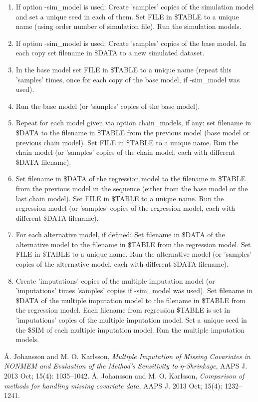 \begin{enumerate}

\item If option -sim\_model is used: Create 'samples' copies of the simulation model and set a unique  seed in each of them. Set FILE in \$TABLE to a unique name (using order number of simulation file). Run the simulation models.
\item If option -sim\_model is used: Create 'samples' copies of the base model. In each copy set filename in \$DATA to a new simulated dataset.
\item In the base model set FILE in \$TABLE to a unique name (repeat this 'samples' times, once for each copy of the base model, if -sim\_model was used).
\item Run the base model (or 'samples' copies of the base model).
\item Repeat for each model given via option chain\_models, if any: set filename in \$DATA to the filename in \$TABLE from the previous model (base model or previous chain model). Set FILE in \$TABLE to a unique name. Run the chain model (or 'samples' copies of the chain model, each with different \$DATA filename).
\item Set filename in \$DATA of the regression model to the filename in \$TABLE from the previous model in the sequence (either from the base model or the last chain model). Set FILE in \$TABLE to a unique name. Run the regression model (or 'samples' copies of the regression model, each with different \$DATA filename).
\item For each alternative model, if defined: Set filename in \$DATA of the alternative model to the filename in \$TABLE from the regression model. Set FILE in \$TABLE to a unique name. Run the alternative model (or 'samples' copies of the alternative model, each with different \$DATA filename).
\item Create 'imputations' copies of the multiple imputation model (or 'imputations' times 'samples' copies if -sim\_model was used). Set filename in \$DATA of the multiple imputation model to the filename in \$TABLE from the regression model. Each filename from regression \$TABLE is set in 'imputations' copies of the multiple imputation model. Set a unique seed in the \$SIM of each multiple imputation model. Run the multiple imputation models.
\end{enumerate}



\begin{thebibliography}{99}
 Å. Johansson and M. O. Karlsson, 
{\em Multiple Imputation of Missing Covariates in NONMEM and Evaluation of the Method’s Sensitivity to $\eta$-Shrinkage},
AAPS J. 2013 Oct; 15(4): 1035–1042.
 Å. Johansson and M. O. Karlsson, 
{\em Comparison of methods for handling missing covariate data}, 
AAPS J. 2013 Oct; 15(4): 1232–1241. 
\end{thebibliography}


